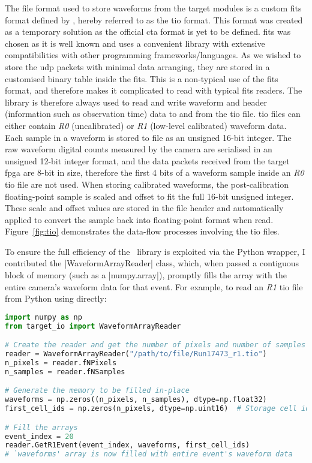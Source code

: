 \noindent The file format used to store waveforms from the \gls{target} modules is a custom \gls{fits} format defined by , hereby referred to as the \gls{tio} format. This format was created as a temporary solution as the official \gls{cta} format is yet to be defined. \gls{fits} was chosen as it is well known and uses a convenient library with extensive compatibilities with other programming frameworks/languages. As we wished to store the \gls{udp} packets with minimal data arranging, they are stored in a customised binary table inside the \gls{fits}. This is a non-typical use of the \gls{fits} format, and therefore makes it complicated to read with typical \gls{fits} readers. The  library is therefore always used to read and write waveform and header (information such as observation time) data to and from the \gls{tio} file. \gls{tio} files can either contain \textit{R0} (uncalibrated)  or \textit{R1} (low-level calibrated) waveform data. Each sample in a waveform is stored to file as an unsigned 16-bit integer. The raw waveform digital counts measured by the camera are serialised in an unsigned 12-bit integer format, and the data packets received from the \gls{target} \gls{fpga} are 8-bit in size, therefore the first 4 bits of a waveform sample inside an \textit{R0} \gls{tio} file are not used. When storing calibrated waveforms, the post-calibration floating-point sample is scaled and offset to fit the full 16-bit unsigned integer. These scale and offset values are stored in the file header and automatically applied to convert the sample back into floating-point format when read. Figure~\ref{fig:tio} demonstrates the data-flow processes involving the \gls{tio} files.

To ensure the full efficiency of the \cpp~library is exploited via the Python wrapper, I contributed the |WaveformArrayReader| class, which, when passed a contiguous block of memory (such as a \lstset{language=Python}|numpy.array|), promptly fills the array with the entire camera's waveform data for that event. For example, to read an \textit{R1} \gls{tio} file from Python using  directly:

\begin{lstlisting}[language=Python]
import numpy as np
from target_io import WaveformArrayReader

# Create the reader and get the number of pixels and number of samples from the header
reader = WaveformArrayReader("/path/to/file/Run17473_r1.tio")
n_pixels = reader.fNPixels
n_samples = reader.fNSamples

# Generate the memory to be filled in-place
waveforms = np.zeros((n_pixels, n_samples), dtype=np.float32)
first_cell_ids = np.zeros(n_pixels, dtype=np.uint16)  # Storage cell id for the first sample of the event per pixel

# Fill the arrays
event_index = 20
reader.GetR1Event(event_index, waveforms, first_cell_ids)
# `waveforms' array is now filled with entire event's waveform data
\end{lstlisting}

